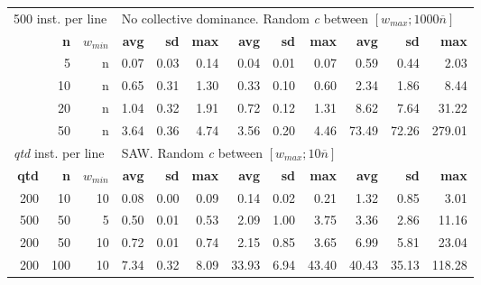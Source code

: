 \begin{table}
\begin{tabular}{@{\extracolsep{4pt}}rrrrrrrrrrrr@{}}
\multicolumn{3}{l}{500 inst. per line} & \multicolumn{9}{l}{No collective dominance. Random \emph{c} between \([w_{max}; 1000\overline{n}]\)}\\
\cline{1-3}\cline{4-12}
& \textbf{n} & \(w_{min}\) & \textbf{avg} & \textbf{sd} & \textbf{max} & \textbf{avg} & \textbf{sd} & \textbf{max} & \textbf{avg} & \textbf{sd} & \textbf{max}\\
\cline{1-3}\cline{4-6}\cline{7-9}\cline{10-12}
&  5 & n & 0.07 & 0.03 & 0.14 & 0.04 & 0.01 & 0.07 & 0.59 & 0.44 & 2.03\\
& 10 & n & 0.65 & 0.31 & 1.30 & 0.33 & 0.10 & 0.60 & 2.34 & 1.86 & 8.44\\
& 20 & n & 1.04 & 0.32 & 1.91 & 0.72 & 0.12 & 1.31 & 8.62 & 7.64 & 31.22\\
& 50 & n & 3.64 & 0.36 & 4.74 & 3.56 & 0.20 & 4.46 & 73.49 & 72.26 & 279.01\\
\hline

\multicolumn{3}{l}{\emph{qtd} inst. per line} & \multicolumn{9}{l}{SAW. Random \emph{c} between \([w_{max}; 10\overline{n}]\)}\\
\cline{1-3}\cline{4-12}
\textbf{qtd} & \textbf{n} & \(w_{min}\) & \textbf{avg} & \textbf{sd} & \textbf{max} & \textbf{avg} & \textbf{sd} & \textbf{max} & \textbf{avg} & \textbf{sd} & \textbf{max}\\
\cline{1-3}\cline{4-6}\cline{7-9}\cline{10-12}
~200 &  10 & 10 & 0.08 & 0.00 & 0.09 & 0.14 & 0.02 & 0.21 & 1.32 & 0.85 & 3.01\\
~500 &  50 &  5 & 0.50 & 0.01 & 0.53 & 2.09 & 1.00 & 3.75 & 3.36 & 2.86 & 11.16\\
~200 &  50 & 10 & 0.72 & 0.01 & 0.74 & 2.15 & 0.85 & 3.65 & 6.99 & 5.81 & 23.04\\
~200 & 100 & 10 & 7.34 & 0.32 & 8.09 & 33.93 & 6.94 & 43.40 & 40.43 & 35.13 & 118.28\\
\hline

\end{tabular}
\end{table}


